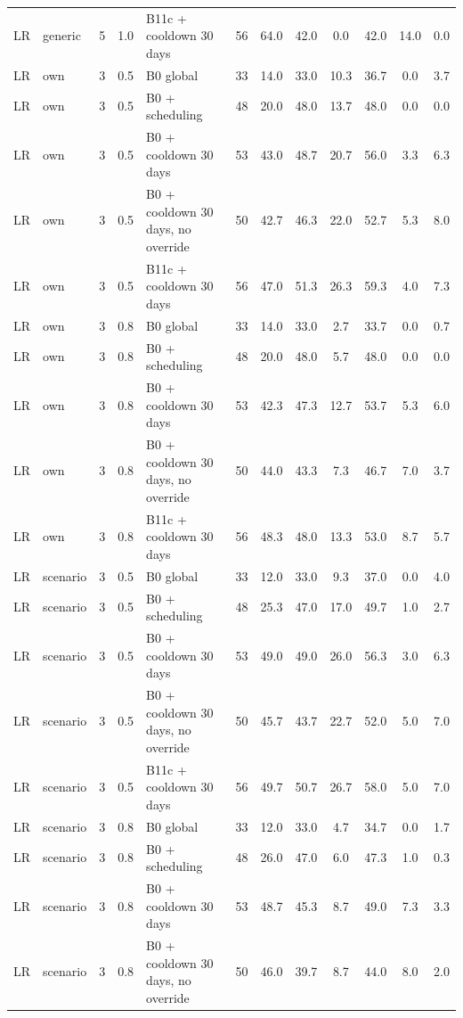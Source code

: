 \begin{longtable}{lllllccccccc}
LR & generic & 5 & 1.0 & B11c + cooldown 30 days & 56 & 64.0 & 42.0 & 0.0 & 42.0 & 14.0 & 0.0 \\
LR & own & 3 & 0.5 & B0 global & 33 & 14.0 & 33.0 & 10.3 & 36.7 & 0.0 & 3.7 \\
LR & own & 3 & 0.5 & B0 + scheduling & 48 & 20.0 & 48.0 & 13.7 & 48.0 & 0.0 & 0.0 \\
LR & own & 3 & 0.5 & B0 + cooldown 30 days & 53 & 43.0 & 48.7 & 20.7 & 56.0 & 3.3 & 6.3 \\
LR & own & 3 & 0.5 & B0 + cooldown 30 days, no override & 50 & 42.7 & 46.3 & 22.0 & 52.7 & 5.3 & 8.0 \\
LR & own & 3 & 0.5 & B11c + cooldown 30 days & 56 & 47.0 & 51.3 & 26.3 & 59.3 & 4.0 & 7.3 \\
LR & own & 3 & 0.8 & B0 global & 33 & 14.0 & 33.0 & 2.7 & 33.7 & 0.0 & 0.7 \\
LR & own & 3 & 0.8 & B0 + scheduling & 48 & 20.0 & 48.0 & 5.7 & 48.0 & 0.0 & 0.0 \\
LR & own & 3 & 0.8 & B0 + cooldown 30 days & 53 & 42.3 & 47.3 & 12.7 & 53.7 & 5.3 & 6.0 \\
LR & own & 3 & 0.8 & B0 + cooldown 30 days, no override & 50 & 44.0 & 43.3 & 7.3 & 46.7 & 7.0 & 3.7 \\
LR & own & 3 & 0.8 & B11c + cooldown 30 days & 56 & 48.3 & 48.0 & 13.3 & 53.0 & 8.7 & 5.7 \\
LR & scenario & 3 & 0.5 & B0 global & 33 & 12.0 & 33.0 & 9.3 & 37.0 & 0.0 & 4.0 \\
LR & scenario & 3 & 0.5 & B0 + scheduling & 48 & 25.3 & 47.0 & 17.0 & 49.7 & 1.0 & 2.7 \\
LR & scenario & 3 & 0.5 & B0 + cooldown 30 days & 53 & 49.0 & 49.0 & 26.0 & 56.3 & 3.0 & 6.3 \\
LR & scenario & 3 & 0.5 & B0 + cooldown 30 days, no override & 50 & 45.7 & 43.7 & 22.7 & 52.0 & 5.0 & 7.0 \\
LR & scenario & 3 & 0.5 & B11c + cooldown 30 days & 56 & 49.7 & 50.7 & 26.7 & 58.0 & 5.0 & 7.0 \\
LR & scenario & 3 & 0.8 & B0 global & 33 & 12.0 & 33.0 & 4.7 & 34.7 & 0.0 & 1.7 \\
LR & scenario & 3 & 0.8 & B0 + scheduling & 48 & 26.0 & 47.0 & 6.0 & 47.3 & 1.0 & 0.3 \\
LR & scenario & 3 & 0.8 & B0 + cooldown 30 days & 53 & 48.7 & 45.3 & 8.7 & 49.0 & 7.3 & 3.3 \\
LR & scenario & 3 & 0.8 & B0 + cooldown 30 days, no override & 50 & 46.0 & 39.7 & 8.7 & 44.0 & 8.0 & 2.0 \\

\end{longtable}
